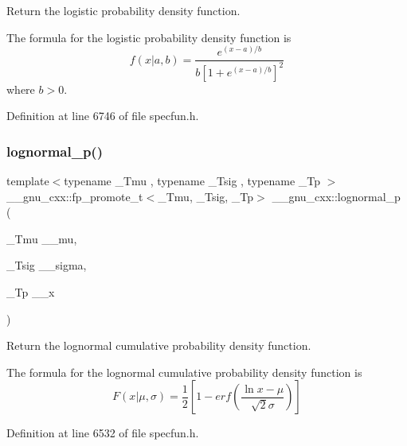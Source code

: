 Return the logistic probability density function. 

The formula for the logistic probability density function is \[ f(x| a, b) = \frac{e^{(x - a)/b}}{b[1 + e^{(x - a)/b}]^2} \] where $b > 0$. 

Definition at line 6746 of file specfun.\+h.

\mbox{\label{group__gnu__math__spec__func_ga3bbd4feb10f2d745bf8aca8748099c53}} 
\subsubsection{\texorpdfstring{lognormal\+\_\+p()}{lognormal\_p()}}
{\footnotesize\ttfamily template$<$typename \+\_\+\+Tmu , typename \+\_\+\+Tsig , typename \+\_\+\+Tp $>$ \\
\+\_\+\+\_\+gnu\+\_\+cxx\+::fp\+\_\+promote\+\_\+t$<$\+\_\+\+Tmu, \+\_\+\+Tsig, \+\_\+\+Tp$>$ \+\_\+\+\_\+gnu\+\_\+cxx\+::lognormal\+\_\+p (\begin{DoxyParamCaption}\item[{\+\_\+\+Tmu}]{\+\_\+\+\_\+mu,  }\item[{\+\_\+\+Tsig}]{\+\_\+\+\_\+sigma,  }\item[{\+\_\+\+Tp}]{\+\_\+\+\_\+x }\end{DoxyParamCaption})\hspace{0.3cm}{\ttfamily [inline]}}



Return the lognormal cumulative probability density function. 

The formula for the lognormal cumulative probability density function is \[ F(x|\mu,\sigma) = \frac{1}{2}\left[ 1-erf(\frac{\ln{x}-\mu}{\sqrt{2}\sigma}) \right] \] 

Definition at line 6532 of file specfun.\+h.

\mbox{\label{group__gnu__math__spec__func_gaef4db41e58e53144df2ddcc834d88e0b}} 
